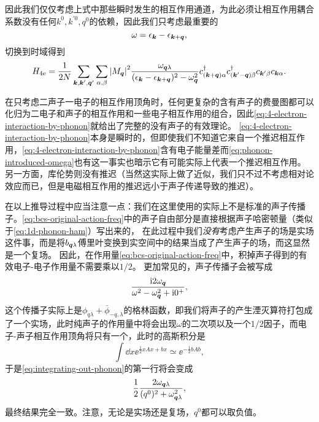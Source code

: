 因此我们仅仅考虑上式中那些瞬时发生的相互作用通道，为此必须让相互作用耦合系数没有任何$k^0, k^{'0}, q^0$的依赖，因此我们只考虑最重要的
\begin{equation}
    \omega = \epsilon_{\vb*{k}} - \epsilon_{\vb*{k}+\vb*{q}},
\end{equation}
切换到时域得到
\begin{equation}
    {H}_{4\text{e}} = \frac{1}{2N} \sum_{\vb*{k}, \vb*{k}', \vb*{q}'} \sum_{\alpha, \beta} \abs{M_{\vb*{q}}}^2 \frac{\omega_{\vb*{q} \lambda}}{(\epsilon_{\vb*{k}} - \epsilon_{\vb*{k}+\vb*{q}})^2 - \omega_{\vb*{q}}^2} {c}^\dagger_{(\vb*{k}+\vb*{q}) \alpha} {c}^\dagger_{(\vb*{k}'-\vb*{q}) \beta} {c}_{\vb*{k}' \beta} {c}_{\vb*{k} \alpha}.
    \label{eq:4-electron-interaction-by-phonon}
\end{equation}

在只考虑二声子一电子的相互作用顶角时，任何更复杂的含有声子的费曼图都可以化归为二电子和声子的相互作用和一些电子相互作用的组合，因此\eqref{eq:4-electron-interaction-by-phonon}就给出了完整的没有声子的有效理论。
\eqref{eq:4-electron-interaction-by-phonon}本身是瞬时的，但即使我们不知道它来自一个推迟相互作用，\eqref{eq:4-electron-interaction-by-phonon}含有电子能量差而\eqref{eq:phonon-introduced-omega}也有这一事实也暗示它有可能实际上代表一个推迟相互作用。
另一方面，库伦势则没有推迟（当然这实际上做了近似，我们只不过不考虑相对论效应而已，但是电磁相互作用的推迟远小于声子传递导致的推迟）。

在以上推导过程中应当注意一点：我们在这里使用的实际上不是标准的声子传播子。\eqref{eq:bcs-original-action-freq}中的声子自由部分是直接根据声子哈密顿量（类似于\eqref{eq:1d-phonon-ham}）写出来的，
在此过程中我们\emph{没有}考虑产生声子的场是实场这件事，而是将$b_{\vb*{q} \lambda}$傅里叶变换到实空间中的结果当成了产生声子的场，而这显然是一个复场。
因此，在作用量\eqref{eq:bcs-original-action-freq}中，积掉声子得到的有效电子-电子作用量不需要乘以$1/2$。
更加常见的，声子传播子会被写成
\[
    \frac{\mathrm{i} 2 \omega_{\vb*{q}}}{\omega^2 - \omega_{\vb*{q}}^2 + \mathrm{i} 0^+},
\]
这个传播子实际上是$\phi_{q \lambda} + \bar{\phi}_{-q, \lambda}$的格林函数，即我们将声子的产生湮灭算符打包成了一个实场，此时纯声子的作用量中将会出现$\omega$的二次项以及一个$1/2$因子，而电子-声子相互作用顶角将只有一个，此时的高斯积分是
\[
    \int \dd{x} \ee^{ \frac{1}{2} x A x + b x} \simeq \ee^{- \frac{1}{2} b A b},
\]
于是\eqref{eq:integrating-out-phonon}的第一行将会变成
\[
    \frac{1}{2} \frac{2 \omega_{\vb*{q} \lambda}}{(q^0)^2 + \omega_{\vb*{q} \lambda}^2},
\]
最终结果完全一致。注意，无论是实场还是复场，$q^0$都可以取负值。


